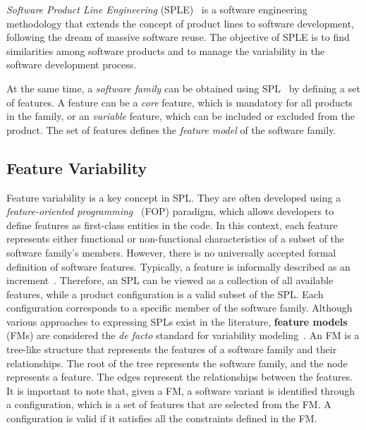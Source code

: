 \textit{Software Product Line Engineering} (SPLE)~\cite{Van01, Van07} is a software engineering methodology that extends the concept of product lines to software development, following the dream of massive software reuse. The objective of SPLE is to find similarities among software products and to manage the variability in the software development process.

At the same time, a \textit{software family} can be obtained using SPL~\cite{Clements01} by defining a set of features. A feature can be a \textit{core} feature, which is mandatory for all products in the family, or an \textit{variable} feature, which can be included or excluded from the product. The set of features defines the \textit{feature model} of the software family.

\subsection{Feature Variability}\label{subsec:background:FeatureVariabilityInSPL}

Feature variability is a key concept in SPL. They are often developed using a \textit{feature-oriented programming}~\cite{Prehofer97} (FOP) paradigm, which allows developers to define features as first-class entities in the code. In this context, each feature represents either functional or non-functional characteristics of a subset of the software family's members. However, there is no universally accepted formal definition of software features. Typically, a feature is informally described as an increment~\cite{Batory21}. Therefore, an SPL can be viewed as a collection of all available features, while a product configuration is a valid subset of the SPL. Each configuration corresponds to a specific member of the software family. Although various approaches to expressing SPLs exist in the literature, \textbf{feature models}~\cite{Kang90} (FMs) are considered the \textit{de facto} standard for variability modeling~\cite{Czarnecki12}.
An FM is a tree-like structure that represents the features of a software family and their relationships. The root of the tree represents the software family, and the node represents a feature. The edges represent the relationships between the features.
It is important to note that, given a FM, a software variant is identified through a configuration, which is a set of features that are selected from the FM. A configuration is valid if it satisfies all the constraints defined in the FM.


